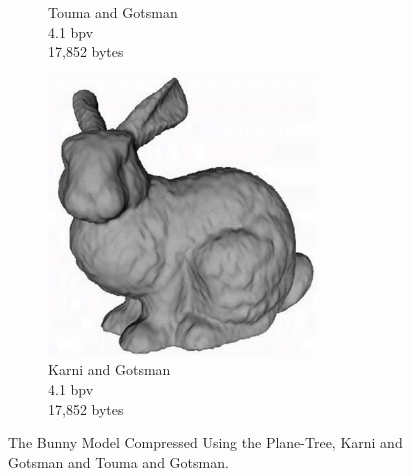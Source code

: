 \begin{figure}[H]
\begin{center}
\begin{subfigure}[b]{3in}
                \caption{Touma and Gotsman \cite{touma98triangle}\\4.1 bpv\\17,852 bytes}
                \label{fig:FIG_HORSEB}
        \end{subfigure}%
        \begin{subfigure}[b]{3in}
                \includegraphics[width=2.8in]{images/experiments/pt_qual/kg}
                \caption{Karni and Gotsman \cite{Karni00Spectral}\\4.1 bpv\\17,852 bytes}
                \label{fig:FIG_BUNNYD}
        \end{subfigure}
       \caption{The Bunny Model Compressed Using the Plane-Tree, Karni and Gotsman and Touma and Gotsman.}
       \label{fig:qualSOTA1}
       \end{center}
\end{figure}


